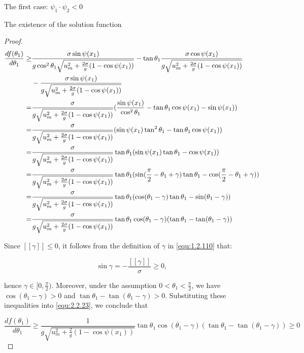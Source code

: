 \documentclass[letterpaper,reqno,10pt,twoside]{amsart}
\theoremstyle{definition}
\theoremstyle{remark}
\begin{document}
\begin{section}{The first case: $\psi_1\cdot \psi_2<0$ }
\begin{subsection}{The existence of the solution function}
\begin{proof}
        \begin{align}
            \frac{df(\theta_1)}{d\theta_1}\geq &\frac{\sigma\sin\psi(x_1)}{g\cos^{2}\theta_1\sqrt{u_m^{2}+\frac{2\sigma}{g}(1-\cos\psi(x_1))}}-\tan\theta_1\frac{\sigma \cos\psi(x_1)}{g\sqrt{u_m^{2}+\frac{2\sigma}{g}(1-\cos\psi(x_1))}}\notag\\
             &-\frac{\sigma\sin\psi(x_1)}{g\sqrt{u_m^{2}+\frac{2\sigma}{g}(1-\cos\psi(x_1))}}\notag\\
             =&\frac{\sigma}{g\sqrt{u_{m}^{2}+\frac{2\sigma}{g}(1-\cos\psi(x_1))}}(\frac{\sin\psi(x_1)}{\cos^{2}\theta_1}-\tan\theta_1 \cos\psi(x_1)-\sin\psi(x_1))\notag\\
             =&\frac{\sigma }{g\sqrt{u_{m}^{2}+\frac{2\sigma}{g}(1-\cos\psi(x_1))}}(\sin\psi(x_1)\tan^{2}\theta_1-\tan\theta_1\cos\psi(x_1))\notag\\
             =&\frac{\sigma }{g\sqrt{u_{m}^{2}+\frac{2\sigma}{g}(1-\cos\psi(x_1))}}\tan\theta_1(\sin\psi(x_1)\tan\theta_1-\cos\psi(x_1)) \notag\\
             =&\frac{\sigma }{g\sqrt{u_{m}^{2}+\frac{2\sigma}{g}(1-\cos\psi(x_1))}}\tan\theta_1(\sin(\frac{\pi}{2}-\theta_1+\gamma)\tan\theta_1-\cos(\frac{\pi}{2}-\theta_1+\gamma)) \notag\\
              =&\frac{\sigma}{g\sqrt{u_{m}^{2}+\frac{2\sigma}{g}(1-\cos\psi(x_1))}}\tan\theta_1(\cos(\theta_1-\gamma)\tan\theta_1-\sin(\theta_1-\gamma)) \notag \\
            =&\frac{\sigma}{g\sqrt{u_{m}^{2}+\frac{2\sigma}{g}(1-\cos\psi(x_1))}}\tan\theta_1\cos(\theta_1-\gamma)(\tan\theta_1-\tan(\theta_1-\gamma)) \label{equ:2.2.23}
        \end{align}

        Since $[\![\gamma]\!]\leq 0$, it follows from the definition of $\gamma$ in \eqref{equ:1.2.110} that:

        \begin{equation*}
            \sin\gamma=-\frac{[\![\gamma]\!]}{\sigma} \geq 0,  
        \end{equation*}

        \noindent hence $\gamma\in [0,\frac{\pi}{2})$. Moreover, under the assumption $0<\theta_1<\frac{\pi}{2}$, we have $\cos(\theta_1-\gamma)>0$ and $\tan\theta_1-\tan(\theta_1-\gamma)>0$. Substituting these inequalities into \eqref{equ:2.2.23}, we conclude that

        \begin{equation*}
            \frac{df(\theta_1)}{d\theta_1}\geq \frac{1}{g\sqrt{u_{m}^{2}+\frac{2}{g}(1-\cos\psi(x_1))}}\tan\theta_1\cos(\theta_1-\gamma)(\tan\theta_1-\tan(\theta_1-\gamma))\geq 0
        \end{equation*}


\end{proof}
\end{subsection}
\end{section}
\end{document}
